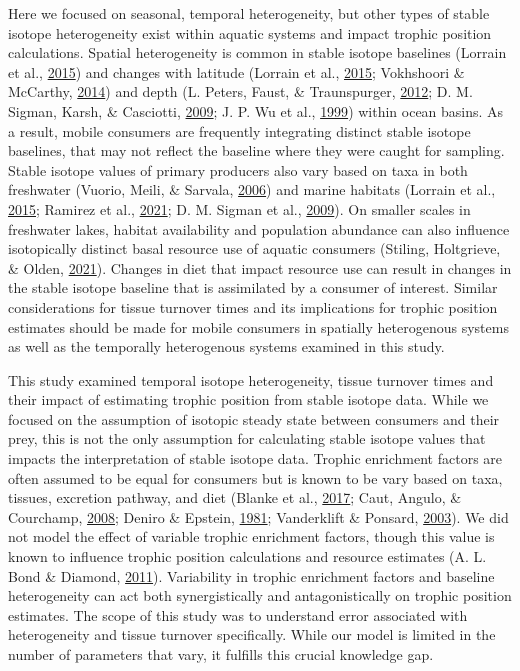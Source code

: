 \documentclass [11pt, proquest] {uwthesis}[2015/03/03]
\begin{document}
Here we focused on seasonal, temporal heterogeneity, but other types of
stable isotope heterogeneity exist within aquatic systems and impact
trophic position calculations. Spatial heterogeneity is common in stable
isotope baselines (Lorrain et al.,
\protect\hyperlink{ref-Lorrain2015}{2015}) and changes with latitude
(Lorrain et al., \protect\hyperlink{ref-Lorrain2015}{2015}; Vokhshoori
\& McCarthy, \protect\hyperlink{ref-Vokshoori2014}{2014}) and depth (L.
Peters, Faust, \& Traunspurger,
\protect\hyperlink{ref-Peters2012}{2012}; D. M. Sigman, Karsh, \&
Casciotti, \protect\hyperlink{ref-Sigman2009}{2009}; J. P. Wu et al.,
\protect\hyperlink{ref-Wu1999}{1999}) within ocean basins. As a result,
mobile consumers are frequently integrating distinct stable isotope
baselines, that may not reflect the baseline where they were caught for
sampling. Stable isotope values of primary producers also vary based on
taxa in both freshwater (Vuorio, Meili, \& Sarvala,
\protect\hyperlink{ref-Vuorio2006}{2006}) and marine habitats (Lorrain
et al., \protect\hyperlink{ref-Lorrain2015}{2015}; Ramirez et al.,
\protect\hyperlink{ref-Ramirez2021}{2021}; D. M. Sigman et al.,
\protect\hyperlink{ref-Sigman2009}{2009}). On smaller scales in
freshwater lakes, habitat availability and population abundance can also
influence isotopically distinct basal resource use of aquatic consumers
(Stiling, Holtgrieve, \& Olden,
\protect\hyperlink{ref-Stiling2021}{2021}). Changes in diet that impact
resource use can result in changes in the stable isotope baseline that
is assimilated by a consumer of interest. Similar considerations for
tissue turnover times and its implications for trophic position
estimates should be made for mobile consumers in spatially heterogenous
systems as well as the temporally heterogenous systems examined in this
study.

This study examined temporal isotope heterogeneity, tissue turnover
times and their impact of estimating trophic position from stable
isotope data. While we focused on the assumption of isotopic steady
state between consumers and their prey, this is not the only assumption
for calculating stable isotope values that impacts the interpretation of
stable isotope data. Trophic enrichment factors are often assumed to be
equal for consumers but is known to be vary based on taxa, tissues,
excretion pathway, and diet (Blanke et al.,
\protect\hyperlink{ref-Blanke2017}{2017}; Caut, Angulo, \& Courchamp,
\protect\hyperlink{ref-Caut2008}{2008}; Deniro \& Epstein,
\protect\hyperlink{ref-Deniro1981}{1981}; Vanderklift \& Ponsard,
\protect\hyperlink{ref-Vanderklift2003}{2003}). We did not model the
effect of variable trophic enrichment factors, though this value is
known to influence trophic position calculations and resource estimates
(A. L. Bond \& Diamond, \protect\hyperlink{ref-Bond2011}{2011}).
Variability in trophic enrichment factors and baseline heterogeneity can
act both synergistically and antagonistically on trophic position
estimates. The scope of this study was to understand error associated
with heterogeneity and tissue turnover specifically. While our model is
limited in the number of parameters that vary, it fulfills this crucial
knowledge gap.
\end{document}

